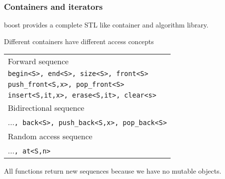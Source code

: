 \documentclass[11pt,a4paper,dvipsnames,usenames]{beamer}
\begin{document}
\begin{frame}[fragile]
  \frametitle{Containers and iterators}

  \vfill

  boost provides a complete STL like container and algorithm library.

  \vfill

  Different containers have different access concepts

  \vfill

  \begin{center}
  \begin{tabular}{|l|} \hline
    Forward sequence \\
    {\lstinline[basicstyle=\ttfamily\normalsize]!begin<S>, end<S>, size<S>, front<S>!} \\
    {\lstinline[basicstyle=\ttfamily\normalsize]!push_front<S,x>, pop_front<S>!} \\
    {\lstinline[basicstyle=\ttfamily\normalsize]!insert<S,it,x>, erase<S,it>, clear<s>!} \\ \hline
    Bidirectional sequence \\
    {...\lstinline[basicstyle=\ttfamily\normalsize]!, back<S>, push_back<S,x>, pop_back<S>!} \\ \hline
    Random access sequence \\
    {...\lstinline[basicstyle=\ttfamily\normalsize]!, at<S,n>!} \\ \hline
  \end{tabular}
  \end{center}

  \vfill

  All functions return new sequences because we have no mutable objects.

  \vfill

\end{frame}
\end{document}
